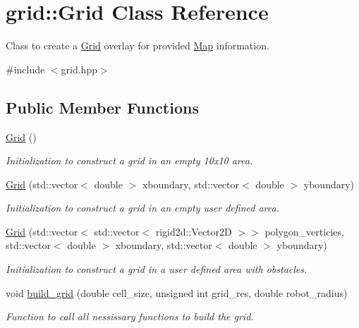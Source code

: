 \hypertarget{classgrid_1_1Grid}{}\section{grid\+:\+:Grid Class Reference}
\label{classgrid_1_1Grid}


Class to create a \hyperlink{classgrid_1_1Grid}{Grid} overlay for provided \hyperlink{structgrid_1_1Map}{Map} information.  




{\ttfamily \#include $<$grid.\+hpp$>$}

\subsection*{Public Member Functions}
\begin{DoxyCompactItemize}
\item 
\mbox{\label{classgrid_1_1Grid_afcee115a9437842956e1efe9e202c302}} 
\hyperlink{classgrid_1_1Grid_afcee115a9437842956e1efe9e202c302}{Grid} ()
\begin{DoxyCompactList}\small\item\em Initialization to construct a grid in an empty 10x10 area. \end{DoxyCompactList}\item 
\hyperlink{classgrid_1_1Grid_a39cd30c1ee231fde7f5a3f228a326ac1}{Grid} (std\+::vector$<$ double $>$ xboundary, std\+::vector$<$ double $>$ yboundary)
\begin{DoxyCompactList}\small\item\em Initialization to construct a grid in an empty user defined area. \end{DoxyCompactList}\item 
\hyperlink{classgrid_1_1Grid_a3fd6c9bb56bc7ae63d6126312e001f23}{Grid} (std\+::vector$<$ std\+::vector$<$ rigid2d\+::\+Vector2D $>$$>$ polygon\+\_\+verticies, std\+::vector$<$ double $>$ xboundary, std\+::vector$<$ double $>$ yboundary)
\begin{DoxyCompactList}\small\item\em Initialization to construct a grid in a user defined area with obstacles. \end{DoxyCompactList}\item 
void \hyperlink{classgrid_1_1Grid_adcba03289a5d2de6e209b2a3ded5d5ac}{build\+\_\+grid} (double cell\+\_\+size, unsigned int grid\+\_\+res, double robot\+\_\+radius)
\begin{DoxyCompactList}\small\item\em Function to call all nessissary functions to build the grid. \end{DoxyCompactList}\item 
$$
\end{DoxyCompactItemize}
